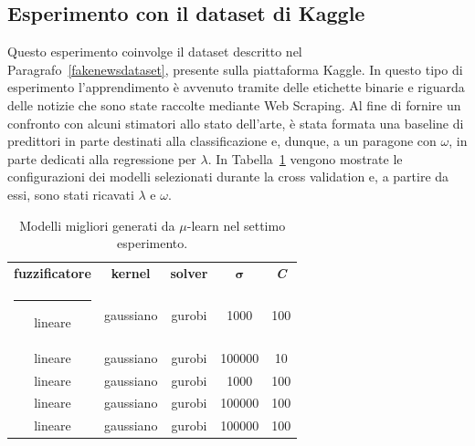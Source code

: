 \documentclass[12pt]{report}
\makeatletter
\theoremstyle{definition}
\newcommand{\thickhline}{%
    \noalign {\ifnum 0=`}\fi \hrule height 1pt
    \futurelet \reserved@a \@xhline
}
\makeatother
\begin{document}
\subsection{Esperimento con il dataset di Kaggle}
Questo esperimento coinvolge il dataset descritto nel Paragrafo~\ref{fakenewsdataset}, presente sulla piattaforma Kaggle. In questo tipo di esperimento l'apprendimento è avvenuto tramite delle etichette binarie e riguarda delle notizie che sono state raccolte mediante Web Scraping.
Al fine di fornire un confronto con alcuni stimatori allo stato dell'arte, è stata formata una baseline di predittori in parte destinati alla classificazione e, dunque, a un paragone con $\omega$, in parte dedicati alla regressione per $\lambda$.
In Tabella~\ref{models_exp7} vengono mostrate le configurazioni dei modelli selezionati durante la cross validation e, a partire da essi, sono stati ricavati $\lambda$ e $\omega$.
\begin{table}
\centering
\begin{adjustbox}{max width=\textwidth}
 \begin{tabular}{|c|c|c|c|c|} 
 \hline
\textbf{fuzzificatore} & \textbf{kernel} & \textbf{solver} & $\bm{\sigma}$ & \textit{\textbf{C}}
\\ [0.5ex] 
 \thickhline
 lineare & gaussiano & gurobi & 1000 & 100 \\
 lineare & gaussiano & gurobi & 100000 & 10 \\
 lineare & gaussiano & gurobi & 1000 & 100 \\
 lineare & gaussiano & gurobi & 100000 & 100 \\
 lineare & gaussiano & gurobi & 100000 & 100 \\
 \hline
\end{tabular}
\end{adjustbox}
\caption{Modelli migliori generati da $\mu$-learn nel settimo esperimento.}
\label{models_exp7}
\end{table}
\end{document}
